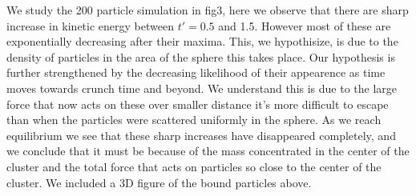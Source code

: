 \documentclass{article}
\begin{document}



We study the 200 particle simulation in fig3, here we observe that there are sharp increase
in kinetic energy between $t'=0.5$ and 1.5. However most of these are exponentially 
decreasing after their maxima. This, we hypothisize, is due to the density of particles
in the area of the sphere this takes place. Our hypothesis is further strengthened by
the decreasing likelihood of their appearence as time moves towards crunch time and beyond.
We understand this is due to the large force that now acts on these over smaller distance
it's more difficult to escape than when the particles were scattered uniformly in the sphere.
As we reach equilibrium we see that these sharp increases have disappeared completely, and we
conclude that it must be because of the mass concentrated in the center of the cluster and the 
total force that acts on particles so close to the center of the cluster.
We included a 3D figure of the bound particles above.
\end{document}
